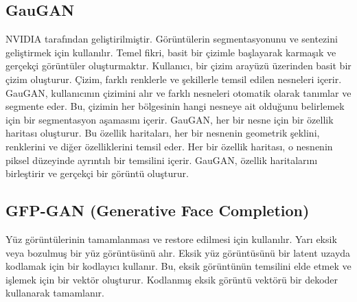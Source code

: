 \subsection{GauGAN}
NVIDIA tarafından geliştirilmiştir. Görüntülerin segmentasyonunu ve sentezini geliştirmek için kullanılır. Temel fikri, basit bir çizimle başlayarak karmaşık ve gerçekçi görüntüler oluşturmaktır. Kullanıcı, bir çizim arayüzü üzerinden basit bir çizim oluşturur. Çizim, farklı renklerle ve şekillerle temsil edilen nesneleri içerir. GauGAN, kullanıcının çizimini alır ve farklı nesneleri otomatik olarak tanımlar ve segmente eder. Bu, çizimin her bölgesinin hangi nesneye ait olduğunu belirlemek için bir segmentasyon aşamasını içerir. GauGAN, her bir nesne için bir özellik haritası oluşturur. Bu özellik haritaları, her bir nesnenin geometrik şeklini, renklerini ve diğer özelliklerini temsil eder. Her bir özellik haritası, o nesnenin piksel düzeyinde ayrıntılı bir temsilini içerir. GauGAN, özellik haritalarını birleştirir ve gerçekçi bir görüntü oluşturur.

\subsection{GFP-GAN (Generative Face Completion)}
Yüz görüntülerinin tamamlanması ve restore edilmesi için kullanılır. Yarı eksik veya bozulmuş bir yüz görüntüsünü alır. Eksik yüz görüntüsünü bir latent uzayda kodlamak için bir kodlayıcı kullanır. Bu, eksik görüntünün temsilini elde etmek ve işlemek için bir vektör oluşturur. Kodlanmış eksik görüntü vektörü bir dekoder kullanarak tamamlanır. 

\newpage